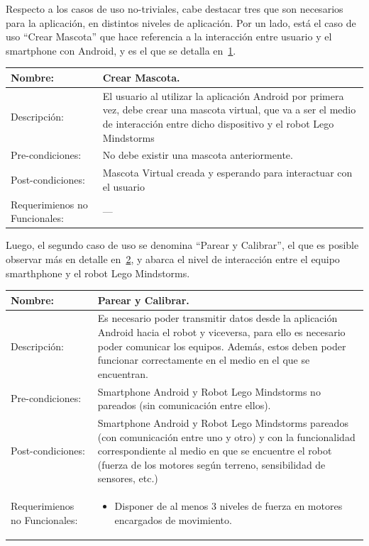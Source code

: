 \documentclass[letterpaper,12pt]{article} %
\numberwithin{equation}{section} %
\numberwithin{figure}{section} %
\numberwithin{table}{section} %
\begin{document}
Respecto a los casos de uso no-triviales, cabe destacar tres que son necesarios para la aplicaci\'on, en distintos niveles de aplicaci\'on. Por un lado, est\'a el caso de uso ``Crear Mascota'' que hace referencia a la interacci\'on entre usuario y el smartphone con Android, y es el que se detalla en~\ref{tab:Crear}.

\begin{table}[hb!]
  \begin{tabular}{p{3cm}p{7cm}}\hline\hline
    Nombre: & Crear Mascota. \\ \hline
    Descripci\'on: & El usuario al utilizar la aplicaci\'on Android por primera vez, debe crear una mascota virtual, que va a ser el medio de interacci\'on entre dicho dispositivo y el robot Lego Mindstorms\\ \hline %
    Pre-condiciones: & No debe existir una mascota anteriormente.\\ \hline
    Post-condiciones: & Mascota Virtual creada y esperando para interactuar con el usuario\\ \hline
    Requerimienos no Funcionales: & ---\\ \hline\hline %
  \end{tabular}
  \label{tab:Crear}
\end{table}

Luego, el segundo caso de uso se denomina ``Parear y Calibrar'', el que es posible observar m\'as en detalle en~\ref{tab:Parear}, y abarca el nivel de interacci\'on entre el equipo smarthphone y el robot Lego Mindstorms.

\begin{table}[hb!]
  \begin{tabular}{p{3cm}p{7cm}}\hline\hline
    Nombre: & Parear y Calibrar. \\ \hline
    Descripci\'on: & Es necesario poder transmitir datos desde la aplicaci\'on Android hacia el robot y viceversa, para ello es necesario poder comunicar los equipos. Adem\'as, estos deben poder funcionar correctamente en el medio en el que se encuentran.\\ \hline %
    Pre-condiciones: & Smartphone Android y Robot Lego Mindstorms no pareados (sin comunicaci\'on entre ellos).\\ \hline
    Post-condiciones: & Smartphone Android y Robot Lego Mindstorms pareados (con comunicaci\'on entre uno y otro) y con la funcionalidad correspondiente al medio en que se encuentre el robot (fuerza de los motores seg\'un terreno, sensibilidad de sensores, etc.)\\ \hline
    Requerimienos no Funcionales: &
    \begin{itemize}
    \item Disponer de al menos 3 niveles de fuerza en motores encargados de movimiento.
    \end{itemize}\\ \hline\hline %
  \end{tabular}
  \label{tab:Parear}
\end{table}
\end{document}
